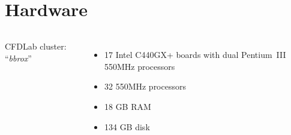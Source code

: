 \documentclass[compress,12pt]{beamer}
\begin{document}
\section{Hardware}



\begin{frame}%
  {
    \begin{columns}
      CFDLab cluster: ``\emph{bbrox}''
      \begin{itemize}
      \item 17 Intel C440GX+ boards with dual Pentium~III 550MHz processors
      \item 32 550MHz processors
      \item 18 GB RAM
      \item 134 GB disk
      \end{itemize}


\end{columns}}
\end{frame}
\end{document}
